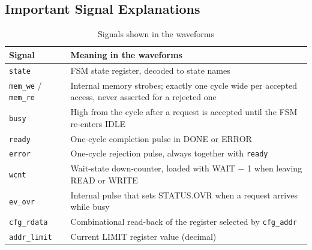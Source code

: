 \documentclass[11pt,a4paper]{article}
\newcommand{\sig}[1]{\texttt{#1}}
\begin{document}
\subsection{Important Signal Explanations}
\begin{table}[H]
\centering
\caption{Signals shown in the waveforms}
\label{tab:sigexp}
\small
\begin{tabularx}{\textwidth}{@{}l X@{}}
\toprule
\textbf{Signal} & \textbf{Meaning in the waveforms} \\
\midrule
\sig{state} & FSM state register, decoded to state names \\
\sig{mem\_we} / \sig{mem\_re} & Internal memory strobes; exactly one cycle wide per accepted access, never asserted for a rejected one \\
\sig{busy} & High from the cycle after a request is accepted until the FSM re-enters IDLE \\
\sig{ready} & One-cycle completion pulse in DONE or ERROR \\
\sig{error} & One-cycle rejection pulse, always together with \sig{ready} \\
\sig{wcnt} & Wait-state down-counter, loaded with WAIT $-$ 1 when leaving READ or WRITE \\
\sig{ev\_ovr} & Internal pulse that sets STATUS.OVR when a request arrives while busy \\
\sig{cfg\_rdata} & Combinational read-back of the register selected by \sig{cfg\_addr} \\
\sig{addr\_limit} & Current LIMIT register value (decimal) \\
\bottomrule
\end{tabularx}
\end{table}
\end{document}
